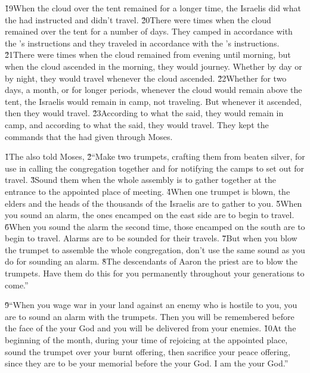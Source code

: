 \v{19}When the cloud over the tent remained for a longer time, the Israelis did what the  had instructed and didn't travel. \v{20}There were times when the cloud remained over the tent for a number of days. They camped in accordance with the 's instructions and they traveled in accordance with the 's instructions. \v{21}There were times when the cloud remained from evening until morning, but when the cloud ascended in the morning, they would journey. Whether by day or by night, they would travel whenever the cloud ascended. \v{22}Whether for two days, a month, or for longer periods, whenever the cloud would remain above the tent, the Israelis would remain in camp, not traveling. But whenever it ascended, then they would travel. \v{23}According to what the  said, they would remain in camp, and according to what the  said, they would travel. They kept the commands that the  had given through Moses.

\v{1}The  also told Moses, \v{2}``Make two trumpets, crafting them from beaten silver, for use in calling the congregation together and for notifying the camps to set out for travel. \v{3}Sound them when the whole assembly is to gather together at the entrance to the appointed place of meeting. \v{4}When one trumpet is blown, the elders and the heads of the thousands of the Israelis are to gather to you. \v{5}When you sound an alarm, the ones encamped on the east side are to begin to travel. \v{6}When you sound the alarm the second time, those encamped on the south are to begin to travel. Alarms are to be sounded for their travels. \v{7}But when you blow the trumpet to assemble the whole congregation, don't use the same sound as you do for sounding an alarm. \v{8}The descendants of Aaron the priest are to blow the trumpets. Have them do this for you permanently throughout your generations to come.''

\v{9}``When you wage war in your land against an enemy who is hostile to you, you are to sound an alarm with the trumpets. Then you will be remembered before the face of the  your God and you will be delivered from your enemies. \v{10}At the beginning of the month, during your time of rejoicing at the appointed place, sound the trumpet over your burnt offering, then sacrifice your peace offering, since they are to be your memorial before the  your God. I am the  your God.''

